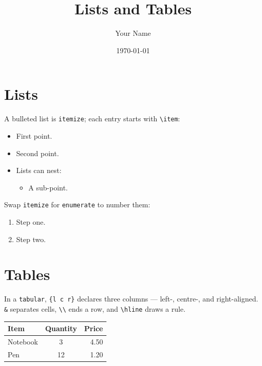 \documentclass[12pt]{article}
\title{Lists and Tables}
\author{Your Name}
\date{\today}
\begin{document}
\maketitle

\section{Lists}

A bulleted list is \texttt{itemize}; each entry starts with \verb|\item|:
\begin{itemize}
    \item First point.
    \item Second point.
    \item Lists can nest:
    \begin{itemize}
        \item A sub-point.
    \end{itemize}
\end{itemize}

Swap \texttt{itemize} for \texttt{enumerate} to number them:
\begin{enumerate}
    \item Step one.
    \item Step two.
\end{enumerate}

\section{Tables}

In a \texttt{tabular}, \verb|{l c r}| declares three columns --- left-,
centre-, and right-aligned. \verb|&| separates cells, \verb|\\| ends a
row, and \verb|\hline| draws a rule.

\begin{center}
\begin{tabular}{l c r}
    \hline
    Item     & Quantity & Price \\
    \hline
    Notebook & 3        & 4.50  \\
    Pen      & 12       & 1.20  \\
    \hline
\end{tabular}
\end{center}
\end{document}
